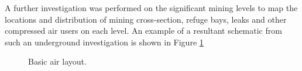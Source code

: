 	A further investigation was performed on the significant mining levels to map the locations and distribution of mining cross-section, refuge bays, leaks and other compressed air users on each level. An example of a resultant schematic from such an underground investigation is shown in Figure \ref{fig: KUS Underground level layout}
	
	\begin{figure}[h!]
		\centering
		\caption{Basic air layout.}
		\label{fig: KUS Underground level layout}
	\end{figure}	
